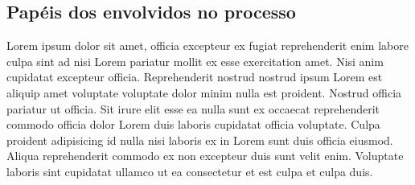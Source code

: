 \documentclass[12pt]{article}
\begin{document}
\subsection*{Papéis dos envolvidos no processo}

Lorem ipsum dolor sit amet, officia excepteur ex fugiat reprehenderit enim labore culpa sint ad nisi Lorem pariatur mollit ex esse exercitation amet. Nisi anim cupidatat excepteur officia. Reprehenderit nostrud nostrud ipsum Lorem est aliquip amet voluptate voluptate dolor minim nulla est proident. Nostrud officia pariatur ut officia. Sit irure elit esse ea nulla sunt ex occaecat reprehenderit commodo officia dolor Lorem duis laboris cupidatat officia voluptate. Culpa proident adipisicing id nulla nisi laboris ex in Lorem sunt duis officia eiusmod. Aliqua reprehenderit commodo ex non excepteur duis sunt velit enim. Voluptate laboris sint cupidatat ullamco ut ea consectetur et est culpa et culpa duis.
\end{document}
